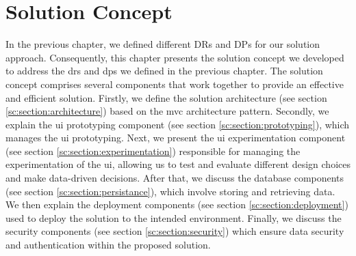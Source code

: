 
\chapter{Solution Concept}
\label{chap:concept}
\ifpdf
    \graphicspath{{Chapters/Solution-Concept/Figs/}{Chapters/Solution-Concept/Figs/}{Chapters/Solution-Concept/Figs/}}
\else
    \graphicspath{{Chapters/Solution-Concept/Figs/}{Chapters/Solution-Concept/Figs/}}
\fi
In the previous chapter, we defined different DRs and DPs for our solution approach. 
Consequently, this chapter presents the solution concept we developed to address the \ac{dr}s and \ac{dp}s we defined in the previous chapter.
The solution concept comprises several components that work together to provide an effective and efficient solution. 
Firstly, we define the solution architecture (see section \ref{sc:section:architecture}) based on the \ac{mvc} architecture pattern. 
Secondly, we explain the \ac{ui} prototyping component (see section \ref{sc:section:prototyping}), which manages the \ac{ui} prototyping. 
Next, we present the \ac{ui} experimentation component (see section \ref{sc:section:experimentation}) responsible for managing the experimentation of the \ac{ui}, allowing us to test and evaluate different design choices and make data-driven decisions.
After that, we discuss the database components (see section \ref{sc:section:persistance}), which involve storing and retrieving data.
We then explain the deployment components (see section \ref{sc:section:deployment}) used to deploy the solution to the intended environment.
Finally, we discuss the security components (see section \ref{sc:section:security}) which ensure data security and authentication within the proposed solution.


